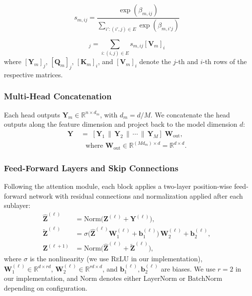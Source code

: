 \documentclass[lettersize,journal]{IEEEtran}
\begin{document}
\begin{equation}
s_{m,ij} = \frac{\exp(\beta_{m,ij})}{\sum_{i': (i',j) \in E} \exp(\beta_{m,i'j})}
\end{equation}

\begin{equation}
[\mathbf{Y}_m]_j = \sum_{i: (i,j) \in E} s_{m,ij} [\mathbf{V}_m]_i
\end{equation}
where $[\mathbf{Y}_m]_j$, $[\mathbf{Q}_m]_j$, $[\mathbf{K}_m]_i$, and $[\mathbf{V}_m]_i$ denote the $j$-th and $i$-th rows of the respective matrices.

\subsubsection{Multi-Head Concatenation}
Each head outputs $\mathbf{Y}_m\in\mathbb{R}^{n\times d_m}$, with $d_m = d/M$.
We concatenate the head outputs along the feature dimension and project back to the model dimension $d$:
\begin{equation}
\label{eq:mh-concat}
\begin{aligned}
\mathbf{Y} &\;=\; [\mathbf{Y}_1 \,\|\, \mathbf{Y}_2 \,\|\, \cdots \,\|\, \mathbf{Y}_M] \;\mathbf{W}_{\text{out}},\\
&\quad\text{where } \mathbf{W}_{\text{out}} \in \mathbb{R}^{(M d_m)\times d} = \mathbb{R}^{d\times d}.
\end{aligned}
\end{equation}



\subsubsection{Feed-Forward Layers and Skip Connections}
Following the attention module, each block applies a two-layer position-wise feed-forward network with residual connections and normalization applied after each sublayer:
\begin{align}
\hat{\mathbf{Z}}^{(\ell)} &= \mathrm{Norm}\!\big(\mathbf{Z}^{(\ell)} + \mathbf{Y}^{(\ell)}\big),\\
\tilde{\mathbf{Z}}^{(\ell)} &= \sigma\!\big(\hat{\mathbf{Z}}^{(\ell)} \mathbf{W}_1^{(\ell)} + \mathbf{b}_1^{(\ell)}\big)\,\mathbf{W}_2^{(\ell)} + \mathbf{b}_2^{(\ell)},\\
\mathbf{Z}^{(\ell+1)} &= \mathrm{Norm}\!\big(\hat{\mathbf{Z}}^{(\ell)} + \tilde{\mathbf{Z}}^{(\ell)}\big),
\end{align}
where $\sigma$ is the nonlinearity (we use \textsc{ReLU} in our implementation), $\mathbf{W}_1^{(\ell)} \in \mathbb{R}^{d \times r d}$, $\mathbf{W}_2^{(\ell)} \in \mathbb{R}^{r d \times d}$, and $\mathbf{b}_1^{(\ell)}, \mathbf{b}_2^{(\ell)}$ are biases. We use $r{=}2$ in our implementation, and $\mathrm{Norm}$ denotes either LayerNorm or BatchNorm depending  on configuration.
\end{document}
